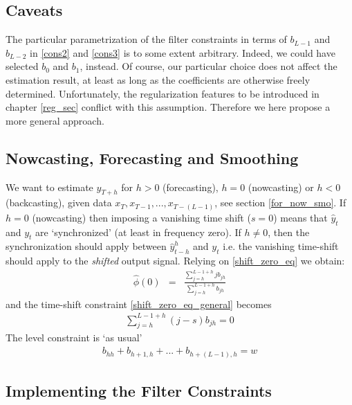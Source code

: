 \documentclass[a4paper]{book}
\begin{document}
\subsection{Caveats}

The particular parametrization of the filter constraints in terms of $b_{L-1}$ and $b_{L-2}$ in \ref{cons2} and \ref{cons3} is to some extent arbitrary. Indeed, we could have selected $b_0$ and $b_1$, instead. Of course, our particular choice does not affect the estimation result, at least as long as the coefficients are otherwise freely determined. Unfortunately, the regularization features to be introduced in chapter \ref{reg_sec} conflict with this assumption. Therefore we here propose a more general approach.



\subsection{Nowcasting, Forecasting and Smoothing}\label{implement}


We want to estimate $y_{T+h}$ for $h>0$ (forecasting), $h=0$ (nowcasting) or $h< 0$ (backcasting), given data $x_T,x_{T-1},...,x_{T-(L-1)}$, see section \ref{for_now_smo}. If $h=0$ (nowcasting) then imposing a vanishing time shift ($s=0$) means that $\hat{y}_t$ and $y_t$ are `synchronized' (at least in frequency zero). If $h\neq 0$, then the synchronization should apply between $\hat{y}_{t-h}^h$ and $y_t$ i.e. the vanishing time-shift should apply to the \emph{shifted} output signal. Relying on  \ref{shift_zero_eq} we obtain:
\begin{eqnarray*}
\hat{\phi}(0)&=&\frac{\sum_{j=h}^{L-1+h}jb_{jh}}{\sum_{j=h}^{L-1+h}b_{jh}}
\end{eqnarray*}
and the time-shift constraint \ref{shift_zero_eq_general} becomes
\begin{eqnarray}
\sum_{j=h}^{L-1+h}(j-s)b_{jh} =0\label{cons11s}
\end{eqnarray}
The level constraint is `as usual'
\begin{eqnarray}\label{cons1s}
b_{hh}+b_{h+1,h}+...+b_{h+(L-1),h}=w
\end{eqnarray}

\subsection{Implementing the Filter Constraints}
\end{document}
